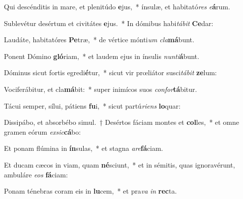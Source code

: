 \item Qui descénditis in mare, et plenitúdo \textbf{e}jus,~* ínsulæ, et habitató\textit{res} \textit{e}\textbf{á}rum.
\item Sublevétur desértum et civitátes \textbf{e}jus.~* In dómibus habi\textit{tá}\textit{bit} \textbf{Ce}dar:
\item Laudáte, habitatóres \textbf{Pe}træ,~* de vértice mónti\textit{um} \textit{cla}\textbf{má}bunt.
\item Ponent Dómino \textbf{gló}riam,~* et laudem ejus in ínsulis \textit{nun}\textit{ti}\textbf{á}bunt.
\item Dóminus sicut fortis egredi\textbf{é}tur,~* sicut vir prœliátor susci\textit{tá}\textit{bit} \textbf{ze}lum:
\item Vociferábitur, et cla\textbf{má}bit:~* super inimícos suos \textit{con}\textit{for}\textbf{tá}bitur.
\item Tácui semper, sílui, pátiens \textbf{fu}i,~* sicut partú\textit{ri}\textit{ens} \textbf{lo}quar:
\item Dissipábo, et absorbébo simul.~† Desértos fáciam montes et \textbf{col}les,~* et omne gramen eórum \textit{ex}\textit{sic}\textbf{cá}bo:
\item Et ponam flúmina in \textbf{ín}sulas,~* et stagna \textit{a}\textit{re}\textbf{fá}ciam.
\item Et ducam cæcos in viam, quam \textbf{né}sciunt,~* et in sémitis, quas ignoravérunt, ambuláre \textit{e}\textit{os} \textbf{fá}ciam:
\item Ponam ténebras coram eis in \textbf{lu}cem,~* et pra\textit{va} \textit{in} \textbf{rec}ta.
